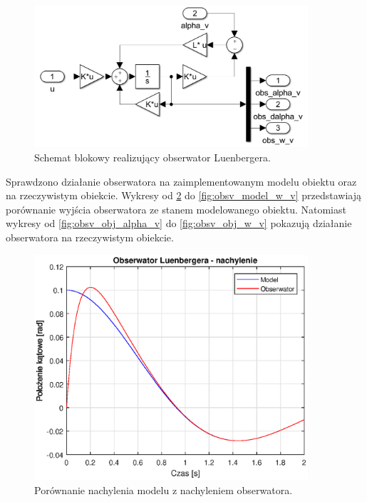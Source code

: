 \documentclass[11pt,a4paper]{article}
\begin{document}
\begin{figure}[H]
	\centering
	\includegraphics[width=4in]{Figures/Luenberger.png}
	\caption{Schemat blokowy realizujący obserwator Luenbergera.}
	\label{fig:Luenberger}
\end{figure}

Sprawdzono działanie obserwatora na zaimplementowanym modelu obiektu oraz na rzeczywistym obiekcie. Wykresy od \ref{fig:obsv_model_alpha_v} do \ref{fig:obsv_model_w_v} przedstawiają porównanie wyjścia obserwatora ze stanem modelowanego obiektu. Natomiast wykresy od \ref{fig:obsv_obj_alpha_v} do \ref{fig:obsv_obj_w_v} pokazują działanie obserwatora na rzeczywistym obiekcie.

\begin{figure}[H]
	\centering
	\includegraphics[width=4in]{Figures/obsv_model_alpha_v.eps}
	\caption{Porównanie nachylenia modelu z nachyleniem obserwatora.}
	\label{fig:obsv_model_alpha_v}
\end{figure}
\end{document}
